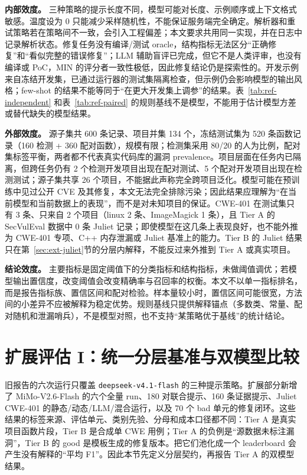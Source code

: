 \documentclass[conference]{IEEEtran}
\begin{document}
\textbf{内部效度。} 三种策略的提示长度不同，模型可能对长度、示例顺序或上下文格式敏感。温度设为 0 只能减少采样随机性，不能保证服务端完全确定。解析器和重试策略若在策略间不一致，会引入工程偏差；本文要求共用同一实现，并在日志中记录解析状态。修复任务没有编译/测试 oracle，结构指标无法区分“正确修复”和“看似完整的错误修复”；LLM 辅助盲评已完成，但它不是人类评审，也没有编译或 PoC，MIN 的评分者一致性极低，因此修复结论仍是探索性的。开发示例来自冻结开发集，已通过运行器的测试集隔离检查，但示例仍会影响模型的输出风格；few-shot 的结果不能等同于“在更大开发集上调参”的结果。表~\ref{tab:ref-independent} 和表~\ref{tab:ref-paired} 的规则基线不是模型，不能用于估计模型方差或替代缺失的模型结果。

\textbf{外部效度。} 源子集共 600 条记录、项目并集 134 个，冻结测试集为 520 条函数记录（160 检测 + 360 配对函数），规模有限；检测集采用 80/20 的人为比例，配对集标签平衡，两者都不代表真实代码库的漏洞 prevalence。项目层面在任务内已隔离，但跨任务仍有 2 个检测开发项目出现在配对测试、5 个配对开发项目出现在检测测试；源子集共享 26 个项目，不能据此声称完全跨项目泛化。模型可能在预训练中见过公开 CVE 及其修复，本文无法完全排除污染；因此结果应理解为“在当前模型和当前数据上的表现”，而不是对未知项目的保证。CWE-401 在测试集只有 3 条、只来自 2 个项目（linux 2 条、ImageMagick 1 条），且 Tier A 的 SecVulEval 数据中 0 条 Juliet 记录；即使模型在这几条上表现良好，也不能外推为 CWE-401 专项、C++ 内存泄漏或 Juliet 基准上的能力。Tier B 的 Juliet 结果只在第~\ref{sec:ext-juliet}节的分层内解释，不能反过来外推到 Tier A 或真实项目。

\textbf{结论效度。} 主要指标是固定阈值下的分类指标和结构指标，未做阈值调优；若模型输出置信度，改变阈值会改变精确率与召回率的权衡。本文不以单一指标排名，而是报告指标族、置信区间和配对检验。样本量较小时，置信区间可能很宽，方法间的小差异不应被解释为稳定优势。规则基线只提供解释锚点（多数类、常量、配对随机和泄漏哨兵），不是模型对照，也不支持“某策略优于基线”的统计结论。


\section{扩展评估 I：统一分层基准与双模型比较}
\label{sec:ext-tier-a}

旧报告的六次运行只覆盖 \texttt{deepseek-v4.1-flash} 的三种提示策略。扩展部分新增了 MiMo-V2.6-Flash 的六个全量 run、180 对联合提示、160 条证据提示、Juliet CWE-401 的静态/动态/LLM/混合运行，以及 70 个 bad 单元的修复闭环。这些结果的标签来源、评估单元、类别先验、分母和成本口径都不同：Tier A 是真实项目函数片段，Tier B 是合成单 CWE 用例；Tier A 的负例是“源数据未标注漏洞”，Tier B 的 good 是模板生成的修复版本。把它们池化成一个 leaderboard 会产生没有解释的“平均 F1”。因此本节先定义分层契约，再报告 Tier A 的双模型结果。
\end{document}

